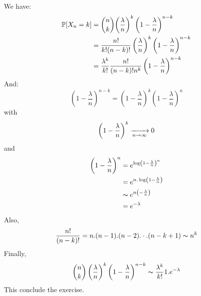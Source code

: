 \begin{solution}
  We have:
  \begin{align*}
    \mathbb{P}[X_n = k] & = \binom{n}{k} {\left( \frac{\lambda}{n} \right)}^k \left(  1- \frac{\lambda}{n} \right)^{n-k}      \\
                    & = \frac{n!}{k!(n-k)!} \left( \frac{\lambda}{n} \right)^k {\left(  1- \frac{\lambda}{n} \right)}^{n-k} \\
                    & = \frac{\lambda^k}{k!} \frac{n!}{(n-k)! n^k} \left( 1- \frac{\lambda}{n} \right)^{n-k}
  \end{align*}
  And:
  \[
    \left(  1- \frac{\lambda}{n} \right)^{n-k} = {\left(  1- \frac{\lambda}{n} \right)}^{k} \left(  1- \frac{\lambda}{n} \right)^{n}
  \]
  with
  \[
    \left(  1- \frac{\lambda}{n} \right)^{k} \xrightarrow[n \to{} \infty]{} 0
  \]
  and
  \begin{align*}
    \left(  1- \frac{\lambda}{n} \right)^n & = e^{\log\left(  1- \frac{\lambda}{n} \right)^n}  \\
                                           & = e^{n.\log\left(  1- \frac{\lambda}{n} \right)}  \\
                                           & \thicksim e^{n\left( - \frac{\lambda}{n} \right)} \\
                                           & = e^{-\lambda}
  \end{align*}
  Also,
  \[ \frac{n!}{(n-k)!}= n.(n-1).(n-2). \cdot . (n-k+1) \thicksim n^k \]
  Finally,
  \[
    \binom{n}{k} \left( \frac{\lambda}{n} \right)^k \left(  1- \frac{\lambda}{n} \right)^{n-k} \thicksim \frac{\lambda^k}{k!} 1. e^{-\lambda}
  \]
  This conclude the exercise.
\end{solution}